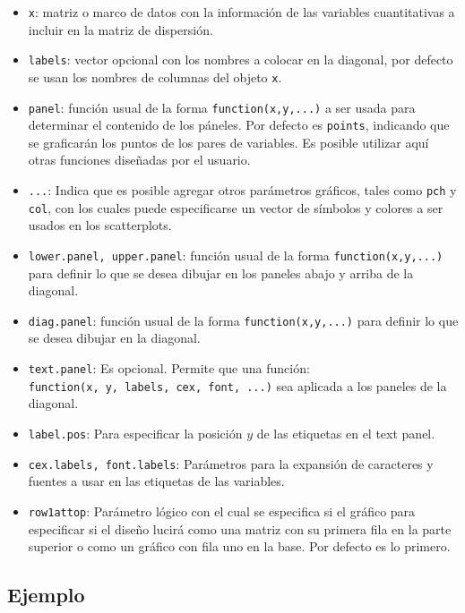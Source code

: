 \documentclass[10pt,]{krantz}
\providecommand{\tightlist}{%
  \setlength{\itemsep}{0pt}\setlength{\parskip}{0pt}}
\begin{document}
\begin{itemize}
\tightlist
\item
  \texttt{x}: matriz o marco de datos con la información de las
  variables cuantitativas a incluir en la matriz de dispersión.
\item
  \texttt{labels}: vector opcional con los nombres a colocar en la
  diagonal, por defecto se usan los nombres de columnas del objeto
  \texttt{x}.
\item
  \texttt{panel}: función usual de la forma \texttt{function(x,y,...)} a
  ser usada para determinar el contenido de los páneles. Por defecto es
  \texttt{points}, indicando que se graficarán los puntos de los pares
  de variables. Es posible utilizar aquí otras funciones diseñadas por
  el usuario.
\item
  \texttt{...}: Indica que es posible agregar otros parámetros gráficos,
  tales como \texttt{pch} y \texttt{col}, con los cuales puede
  especificarse un vector de símbolos y colores a ser usados en los
  scatterplots.
\item
  \texttt{lower.panel,\ upper.panel}: función usual de la forma
  \texttt{function(x,y,...)} para definir lo que se desea dibujar en los
  paneles abajo y arriba de la diagonal.
\item
  \texttt{diag.panel}: función usual de la forma
  \texttt{function(x,y,...)} para definir lo que se desea dibujar en la
  diagonal.
\item
  \texttt{text.panel}: Es opcional. Permite que una función:
  \texttt{function(x,\ y,\ labels,\ cex,\ font,\ ...)} sea aplicada a
  los paneles de la diagonal.
\item
  \texttt{label.pos}: Para especificar la posición \(y\) de las
  etiquetas en el text panel.
\item
  \texttt{cex.labels,\ font.labels}: Parámetros para la expansión de
  caracteres y fuentes a usar en las etiquetas de las variables.
\item
  \texttt{row1attop}: Parámetro lógico con el cual se especifica si el
  gráfico para especificar si el diseño lucirá como una matriz con su
  primera fila en la parte superior o como un gráfico con fila uno en la
  base. Por defecto es lo primero.
\end{itemize}

\subsection*{Ejemplo}\label{ejemplo-14}
\end{document}
